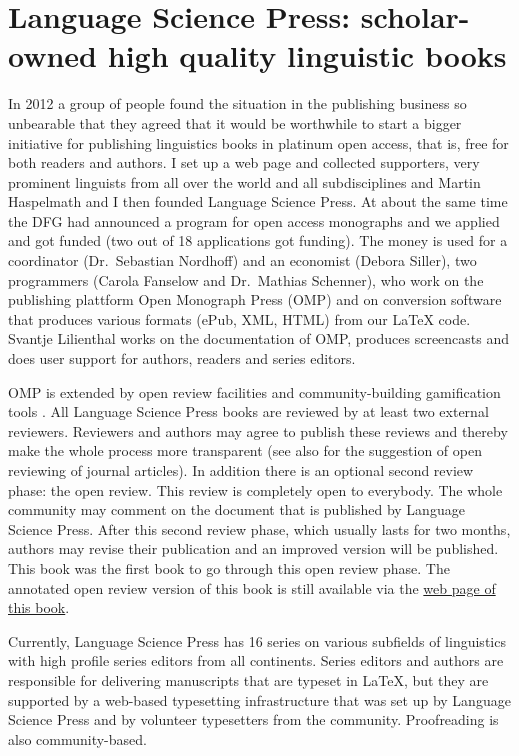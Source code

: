 \section*{Language Science Press: scholar-owned high quality linguistic books}

In 2012 a group of people found the situation in the publishing business so unbearable that they
agreed that it would be worthwhile to start a bigger initiative for publishing linguistics books in
platinum open access, that is, free for both readers and authors. I set up a web page and collected
supporters, very prominent linguists from all over the world and all subdisciplines and Martin
Haspelmath and I then founded Language Science Press. At about the same time the DFG had announced
a program for open access monographs and we applied \citep{MH2013a} and got funded (two out of 18 applications got
funding). The money is used for a coordinator (Dr.\ Sebastian Nordhoff) and an economist (Debora
Siller), two programmers (Carola Fanselow and Dr.\ Mathias Schenner), who work on the publishing
plattform Open Monograph Press (OMP) and on conversion software that produces various formats (ePub, XML,
HTML) from our \LaTeX{} code. Svantje Lilienthal works on the documentation of OMP, produces
screencasts and does user support for authors, readers and series editors.

OMP is extended by open review facilities and community-building gamification tools
\citep{MuellerOA,MH2013a}. All Language Science Press books are reviewed by at least two external
reviewers. Reviewers and authors may agree to publish these reviews and thereby make the whole
process more transparent (see also  for the suggestion of open reviewing of journal
articles). In addition there is an optional second review phase: the open
review. This review is completely open to everybody. The whole community may comment on the document
that is published by Language Science Press. After this second review phase, which usually lasts for
two months, authors may revise their publication and an improved version will be published. This
book was the first book to go through this open review phase. The annotated open review version of this book is still available via
the \href{\lsURL}{web page of this book}. 

Currently, Language Science Press has 16 series on various subfields of linguistics with high
profile series editors from all continents. Series editors  and authors are responsible for
delivering manuscripts that are typeset in \LaTeX{}, but they are supported by a web-based typesetting
infrastructure that was set up by Language Science Press and by volunteer typesetters from the
community. Proofreading is also community-based.

